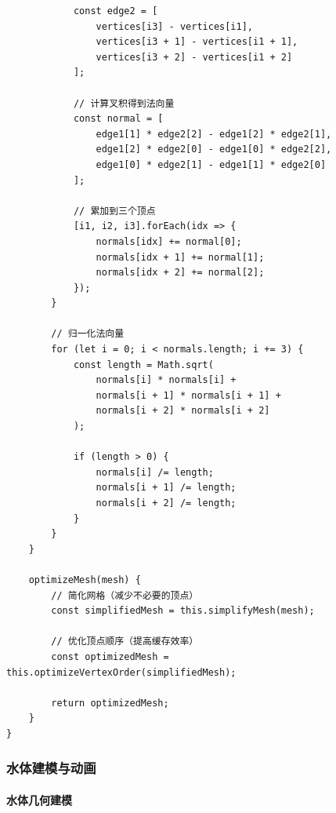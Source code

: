 \begin{lstlisting}
            const edge2 = [
                vertices[i3] - vertices[i1],
                vertices[i3 + 1] - vertices[i1 + 1],
                vertices[i3 + 2] - vertices[i1 + 2]
            ];
            
            // 计算叉积得到法向量
            const normal = [
                edge1[1] * edge2[2] - edge1[2] * edge2[1],
                edge1[2] * edge2[0] - edge1[0] * edge2[2],
                edge1[0] * edge2[1] - edge1[1] * edge2[0]
            ];
            
            // 累加到三个顶点
            [i1, i2, i3].forEach(idx => {
                normals[idx] += normal[0];
                normals[idx + 1] += normal[1];
                normals[idx + 2] += normal[2];
            });
        }
        
        // 归一化法向量
        for (let i = 0; i < normals.length; i += 3) {
            const length = Math.sqrt(
                normals[i] * normals[i] +
                normals[i + 1] * normals[i + 1] +
                normals[i + 2] * normals[i + 2]
            );
            
            if (length > 0) {
                normals[i] /= length;
                normals[i + 1] /= length;
                normals[i + 2] /= length;
            }
        }
    }
    
    optimizeMesh(mesh) {
        // 简化网格（减少不必要的顶点）
        const simplifiedMesh = this.simplifyMesh(mesh);
        
        // 优化顶点顺序（提高缓存效率）
        const optimizedMesh = this.optimizeVertexOrder(simplifiedMesh);
        
        return optimizedMesh;
    }
}
\end{lstlisting}

\subsubsection{水体建模与动画}\label{ux6c34ux4f53ux5efaux6a21ux4e0eux52a8ux753b}

\paragraph{水体几何建模}\label{ux6c34ux4f53ux51e0ux4f55ux5efaux6a21}


